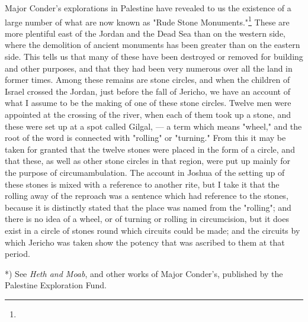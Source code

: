 \documentclass[a4paper, 11pt, oneside, polutonikogreek, english]{article}
\begin{document}
Major Conder's explorations in Palestine have revealed to us the existence of a large number of what are now known as "Rude Stone Monuments."\footnote{} These are more plentiful east of the Jordan and the Dead Sea than on the western side, where the demolition of ancient monuments has been greater than on the eastern side. This tells us that many of these have been destroyed or removed for building and other purposes, and that they had been very numerous over all the land in former times. Among these remains are stone circles, and when the children of Israel crossed the Jordan, just before the fall of Jericho, we have an account of what I assume to be the making of one of these stone circles. Twelve men were appointed at the crossing of the river, when each of them took up a stone, and these were set up at a spot called Gilgal, --- a term which means "wheel," and the root of the word is connected with "rolling" or "turning." From this it may be taken for granted that the twelve stones were placed in the form of a circle, and that these, as well as other stone circles in that region, were put up mainly for the purpose of circumambulation. The account in Joshua of the setting up of these stones is mixed with a reference to another rite, but I take it that the rolling away of the reproach was a sentence which had reference to the stones, because it is distinctly stated that the place was named from the "rolling"; and there is no idea of a wheel, or of turning or rolling in circumcision, but it does exist in a circle of stones round which circuits could be made; and the circuits by which Jericho was taken show the potency that was ascribed to them at that period.

*) See \emph{Heth and Moab}, and other works of Major Conder's, published by the Palestine Exploration Fund.
\end{document}
